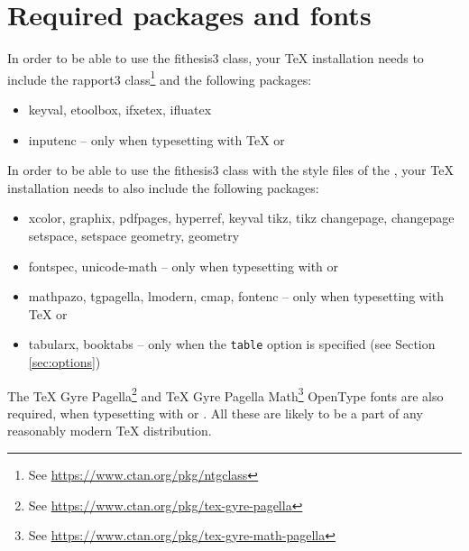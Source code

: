 \documentclass[color,table,cover,twoside,lot,lof]{../../fithesis3}
\begin{document}
  \section{Required packages and fonts}\label{sec:req-packages}
  In order to be able to use the \textsf{fithesis3} class, your
  \TeX{} installation needs to include the \textsf{rapport3}
  class\footnote{See
  \url{https://www.ctan.org/pkg/ntgclass}} and the following
  packages:\begin{itemize}
    \item\textsf{keyval}, \textsf{etoolbox}, \textsf{ifxetex},
      \textsf{ifluatex}
    \item\textsf{inputenc} -- only when typesetting with \TeX{} or
  \end{itemize} In order to be able to use the \textsf{fithesis3}
  class with the style files of the
  \makeatletter\thesis@english@facultyName\makeatother, your
  \TeX{} installation needs to also include the following
  packages:\begin{itemize}
    \item\textsf{xcolor}, \textsf{graphix}, \textsf{pdfpages},
      \textsf{hyperref}, \textsf{keyval}%
      {\makeatletter %
      \def\thguide@prnpkg#1{\ltx@ifpackageloaded%
        {#1}{, \textsf{#1}}{}}%
      \thguide@prnpkg{tikz}%
      \thguide@prnpkg{changepage}%
      \thguide@prnpkg{setspace}%
      \thguide@prnpkg{geometry}}
    \item\textsf{fontspec}, \textsf{unicode-math} -- only when
      typesetting with  or 
    \item\textsf{mathpazo}, \textsf{tgpagella}, \textsf{lmodern},
       \textsf{cmap}, \textsf{fontenc} -- only when typesetting
       with \TeX{} or 
    \item\textsf{tabularx}, \textsf{booktabs} -- only when the
      \texttt{table} option is specified (see Section
      \ref{sec:options})
  \end{itemize}
  The \TeX{} Gyre Pagella\footnote{See
  \url{https://www.ctan.org/pkg/tex-gyre-pagella}} and
  \TeX{} Gyre Pagella Math\footnote{See
  \url{https://www.ctan.org/pkg/tex-gyre-math-pagella}} OpenType
  fonts are also required, when typesetting with  or
  . All these are likely to be a part of any
  reasonably modern \TeX{} distribution.
\end{document}
